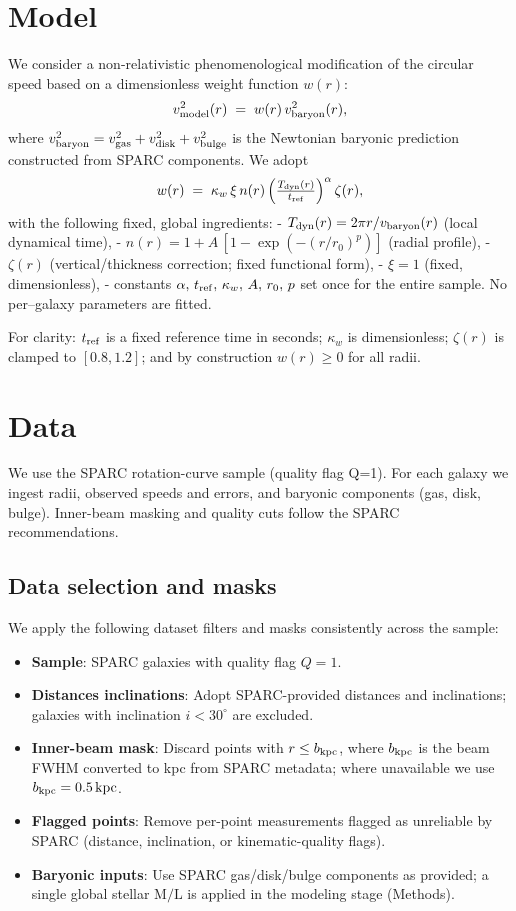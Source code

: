 \documentclass[twocolumn,prd,amsmath,amssymb,aps,superscriptaddress,nofootinbib]{revtex4-2}
\begin{document}
\section{Model}
We consider a non-relativistic phenomenological modification of the circular speed based on a dimensionless weight function $w(r)$:
\begin{equation}
  v^2_{\rm model}(r) \;=\; w(r)\,v^2_{\rm baryon}(r),
\end{equation}
where $v^2_{\rm baryon} = v^2_{\rm gas} + v^2_{\rm disk} + v^2_{\rm bulge}$ is the Newtonian baryonic prediction constructed from SPARC components. We adopt
\begin{equation}
  w(r) \;=\; \kappa_{w}\,\xi\,n(r)\, \Big(\tfrac{T_{\rm dyn}(r)}{t_{\rm ref}}\Big)^{\alpha}\,\zeta(r),
\end{equation}
with the following fixed, global ingredients:
- $T_{\rm dyn}(r) = 2\pi r / v_{\rm baryon}(r)$ (local dynamical time),
- $n(r) = 1 + A\,[1 - \exp(-(r/r_0)^p)]$ (radial profile),
- $\zeta(r)$ (vertical/thickness correction; fixed functional form),
- $\xi=1$ (fixed, dimensionless),
- constants $\alpha,\,t_{\rm ref},\,\kappa_{w},\,A,\,r_0,\,p$ set once for the entire sample.
No per–galaxy parameters are fitted.

For clarity: $t_{\rm ref}$ is a fixed reference time in seconds; $\kappa_w$ is dimensionless; $\zeta(r)$ is clamped to $[0.8,1.2]$; and by construction $w(r)\ge0$ for all radii.

\section{Data}
We use the SPARC rotation-curve sample (quality flag Q=1). For each galaxy we ingest radii, observed speeds and errors, and baryonic components (gas, disk, bulge). Inner-beam masking and quality cuts follow the SPARC recommendations.

\subsection{Data selection and masks}
We apply the following dataset filters and masks consistently across the sample:
\begin{itemize}
  \item \textbf{Sample}: SPARC galaxies with quality flag \(Q{=}1\).
  \item \textbf{Distances \/ inclinations}: Adopt SPARC-provided distances and inclinations; galaxies with inclination \(i{<}30^\circ\) are excluded.
  \item \textbf{Inner-beam mask}: Discard points with \(r\le b_{\rm kpc}\), where \(b_{\rm kpc}\) is the beam FWHM converted to kpc from SPARC metadata; where unavailable we use \(b_{\rm kpc}=0.5\,\mathrm{kpc}\).
  \item \textbf{Flagged points}: Remove per-point measurements flagged as unreliable by SPARC (distance, inclination, or kinematic-quality flags).
  \item \textbf{Baryonic inputs}: Use SPARC gas/disk/bulge components as provided; a single global stellar \(\mathrm{M/L}\) is applied in the modeling stage (Methods).
\end{itemize}
\end{document}
